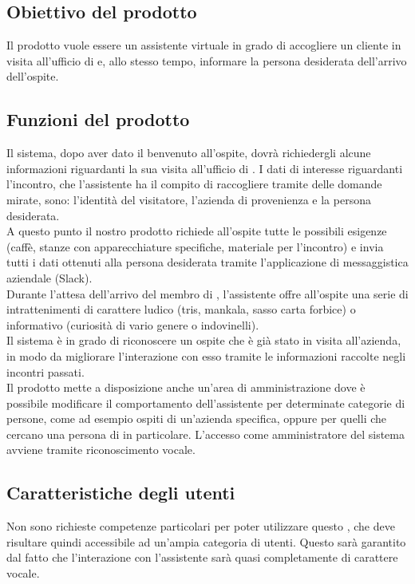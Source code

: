 \subsection{Obiettivo del prodotto}
Il prodotto vuole essere un assistente virtuale in grado di accogliere un cliente in visita all'ufficio di \PROPONENTE{} e, allo stesso tempo, informare la persona desiderata dell'arrivo dell'ospite. 
\subsection{Funzioni del prodotto}
Il sistema, dopo aver dato il benvenuto all'ospite, dovrà richiedergli alcune informazioni riguardanti la sua visita all'ufficio di \PROPONENTE. I dati di interesse riguardanti l'incontro, che l'assistente ha il compito di raccogliere tramite delle domande mirate, sono: l'identità del visitatore, l'azienda di provenienza e la persona desiderata.\\
A questo punto il nostro prodotto richiede all'ospite tutte le possibili esigenze (caffè, stanze con apparecchiature specifiche, materiale per l'incontro) e invia tutti i dati ottenuti alla persona desiderata tramite l'applicazione di messaggistica aziendale (Slack).\\
Durante l'attesa dell'arrivo del membro di \PROPONENTE{}, l'assistente offre all'ospite una serie di intrattenimenti di carattere ludico (tris, mankala, sasso carta forbice) o informativo (curiosità di vario genere o indovinelli).\\
Il sistema è in grado di riconoscere un ospite che è già stato in visita all'azienda, in modo da migliorare l'interazione con esso tramite le informazioni raccolte negli incontri passati. \\
Il prodotto mette a disposizione anche un'area di amministrazione dove è possibile modificare il comportamento dell'assistente per determinate categorie di persone, come ad esempio ospiti di un'azienda specifica, oppure per quelli che cercano una persona di \PROPONENTE{} in particolare. L'accesso come amministratore del sistema avviene tramite riconoscimento vocale.  
\subsection{Caratteristiche degli utenti}
Non sono richieste competenze particolari per poter utilizzare questo , che deve risultare
quindi accessibile ad un'ampia categoria di utenti. Questo sarà garantito dal fatto che l'interazione con l'assistente sarà quasi completamente di carattere vocale.
